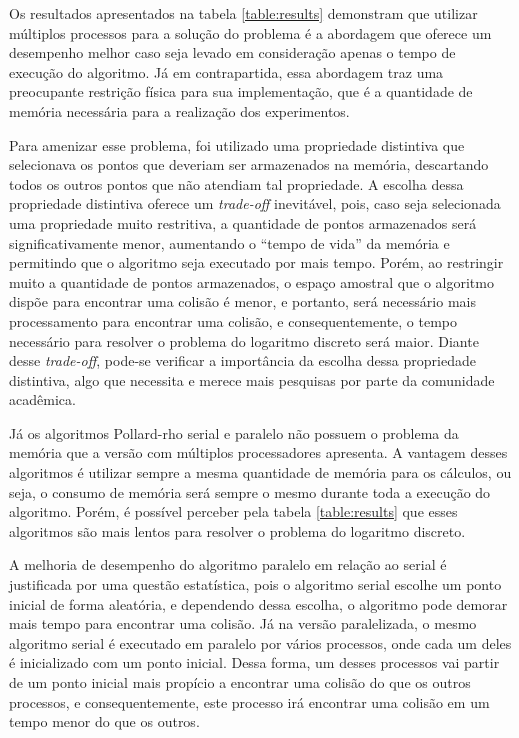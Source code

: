 Os resultados apresentados na tabela \ref{table:results} demonstram que utilizar múltiplos processos para a solução do problema é a abordagem que oferece um desempenho melhor caso seja levado em consideração apenas o tempo de execução do algoritmo. Já em contrapartida, essa abordagem traz uma preocupante restrição física para sua implementação, que é a quantidade de memória necessária para a realização dos experimentos.

Para amenizar esse problema, foi utilizado uma propriedade distintiva que selecionava os pontos que deveriam ser armazenados na memória, descartando todos os outros pontos que não atendiam tal propriedade. A escolha dessa propriedade distintiva oferece um \textit{trade-off} inevitável, pois, caso seja selecionada uma propriedade muito restritiva, a quantidade de pontos armazenados será significativamente menor, aumentando o ``tempo de vida'' da memória e permitindo que o algoritmo seja executado por mais tempo. Porém, ao restringir muito a quantidade de pontos armazenados, o espaço amostral que o algoritmo dispõe para encontrar uma colisão é menor, e portanto, será necessário mais processamento para encontrar uma colisão, e consequentemente, o tempo necessário para resolver o problema do logaritmo discreto será maior. Diante desse \textit{trade-off}, pode-se verificar a importância da escolha dessa propriedade distintiva, algo que necessita e merece mais pesquisas por parte da comunidade acadêmica.

Já os algoritmos Pollard-rho serial e paralelo não possuem o problema da memória que a versão com múltiplos processadores apresenta. A vantagem desses algoritmos é utilizar sempre a mesma quantidade de memória para os cálculos, ou seja, o consumo de memória será sempre o mesmo durante toda a execução do algoritmo. Porém, é possível perceber pela tabela \ref{table:results} que esses algoritmos são mais lentos para resolver o problema do logaritmo discreto.

A melhoria de desempenho do algoritmo paralelo em relação ao serial é justificada por uma questão estatística, pois o algoritmo serial escolhe um ponto inicial de forma aleatória, e dependendo dessa escolha, o algoritmo pode demorar mais tempo para encontrar uma colisão. Já na versão paralelizada, o mesmo algoritmo serial é executado em paralelo por vários processos, onde cada um deles é inicializado com um ponto inicial. Dessa forma, um desses processos vai partir de um ponto inicial mais propício a encontrar uma colisão do que os outros processos, e consequentemente, este processo irá encontrar uma colisão em um tempo menor do que os outros.

